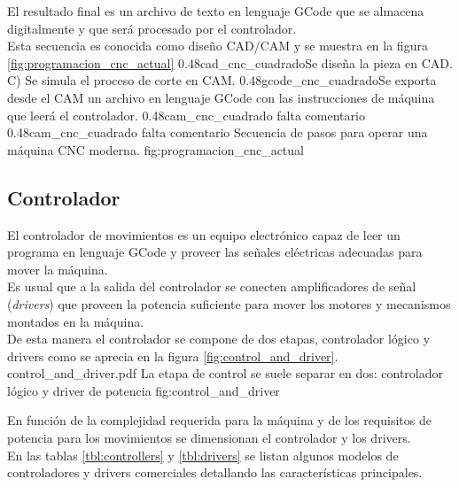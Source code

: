    El resultado final es un archivo de texto en lenguaje GCode que se almacena digitalmente y que será procesado por el controlador.\\
          Esta secuencia es conocida como diseño CAD/CAM y se muestra en la figura \ref{fig:programacion_cnc_actual}
\subfigtwotwo 
            {0.48}{cad_cnc_cuadrado}{Se diseña la pieza en CAD. C) Se simula el proceso de corte en CAM.}
            {0.48}{gcode_cnc_cuadrado}{Se exporta desde el CAM un archivo en lenguaje GCode con las instrucciones de máquina que leerá el controlador.}
            {0.48}{cam_cnc_cuadrado} {falta comentario}
            {0.48}{cam_cnc_cuadrado} {falta comentario}
            {Secuencia de pasos para operar una máquina CNC moderna.}
            {fig:programacion_cnc_actual}




\subsection{Controlador}
El controlador de movimientos es un equipo electrónico capaz de leer un programa en lenguaje GCode y proveer las señales eléctricas adecuadas para mover la máquina.\\
Es usual que a la salida del controlador se conecten amplificadores de señal (\textit{drivers}) que proveen la potencia suficiente para mover los motores y mecanismos montados en la máquina.\\
De esta manera el controlador se compone de dos etapas, controlador lógico y drivers como se aprecia en la figura \ref{fig:control_and_driver}.\\

         {control_and_driver.pdf}
         {La etapa de control se suele separar en dos: controlador lógico y driver de potencia}
         {fig:control_and_driver}

En función de la complejidad requerida para la máquina y de los requisitos de potencia para los movimientos se dimensionan el controlador y los drivers.\\
En las tablas \ref{tbl:controllers} y \ref{tbl:drivers} se listan algunos modelos de controladores y drivers comerciales detallando las características principales.\\

